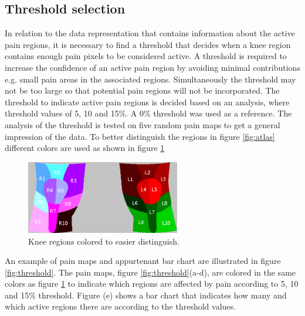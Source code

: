 \subsection{Threshold selection}\label{sec:Selectthreshold}
In relation to the data representation that contains information about the active pain regions, it is necessary to find a threshold that decides when a knee region contains enough pain pixels to be considered active. A threshold is required to increase the confidence of an active pain region by avoiding minimal contributions e.g. small pain areas in the associated regions. Simultaneously the threshold may not be too large so that potential pain regions will not be incorporated. The threshold to indicate active pain regions is decided based on an analysis, where threshold values of 5, 10 and 15\%. A 0\% threshold was used as a reference. 
The analysis of the threshold is tested on five random pain maps to get a general impression of the data. To better distinguish the regions in figure \ref{fig:atlas} different colors are used as shown in figure \ref{fig:colorregion}


\begin{figure} [H]
\centering
\includegraphics[width=0.6\textwidth]{figures/colorregion}
\caption{Knee regions colored to easier distinguish.}
\label{fig:colorregion}
\end{figure}

\noindent
An example of pain maps and appurtenant bar chart are illustrated in figure \ref{fig:threshold}. The pain maps, figure \ref{fig:threshold}(a-d), are colored in the same colors as figure \ref{fig:colorregion} to indicate which regions are affected by pain according to 5, 10 and 15\% threshold. Figure (e) shows a bar chart that indicates how many and which active regions there are according to the threshold values.

